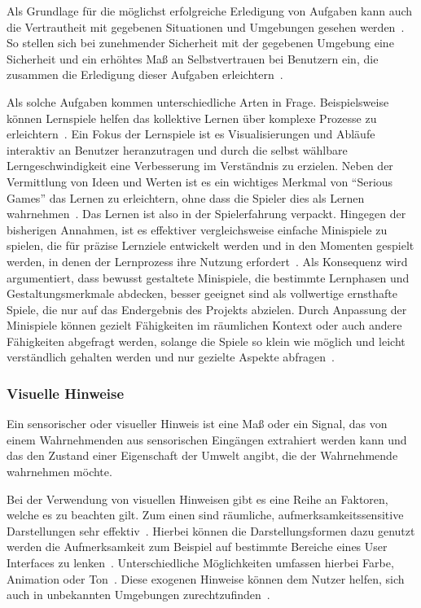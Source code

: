 Als Grundlage für die möglichst erfolgreiche Erledigung von Aufgaben kann auch die Vertrautheit mit gegebenen Situationen und Umgebungen gesehen werden~\cite{scott1966activation}. So stellen sich bei zunehmender Sicherheit mit der gegebenen Umgebung eine Sicherheit und ein erhöhtes Maß an Selbstvertrauen bei Benutzern ein, die zusammen die Erledigung dieser Aufgaben erleichtern~\cite{scott1966activation}. 

Als solche Aufgaben kommen unterschiedliche Arten in Frage. Beispielsweise können Lernspiele helfen das kollektive Lernen über komplexe Prozesse zu erleichtern~\cite{devisch2018mini, lampert2008gespielte, michael2005serious, ritterfeld2009serious}.
Ein Fokus der Lernspiele ist es Visualisierungen und Abläufe interaktiv an Benutzer heranzutragen und durch die selbst wählbare Lerngeschwindigkeit eine Verbesserung im Verständnis zu erzielen.
Neben der Vermittlung von Ideen und Werten ist es ein wichtiges Merkmal von "`Serious Games"' das Lernen zu erleichtern, ohne dass die Spieler dies als Lernen wahrnehmen~\cite{devisch2018mini, michael2005serious, ritterfeld2009serious}.
Das Lernen ist also in der Spielerfahrung verpackt.
Hingegen der bisherigen Annahmen, ist es effektiver vergleichsweise einfache Minispiele zu spielen, die für präzise Lernziele entwickelt werden und in den Momenten gespielt werden, in denen der Lernprozess ihre Nutzung erfordert~\cite{devisch2018mini}.
Als Konsequenz wird argumentiert, dass bewusst gestaltete Minispiele, die bestimmte Lernphasen und Gestaltungsmerkmale abdecken, besser geeignet sind als vollwertige ernsthafte Spiele, die nur auf das Endergebnis des Projekts abzielen. 
Durch Anpassung der Minispiele können gezielt Fähigkeiten im räumlichen Kontext oder auch andere Fähigkeiten abgefragt werden, solange die Spiele so klein wie möglich und leicht verständlich gehalten werden und nur gezielte Aspekte abfragen~\cite{devisch2018mini, michael2005serious, ritterfeld2009serious}.

\subsubsection{Visuelle Hinweise}

Ein sensorischer oder visueller Hinweis ist eine Maß oder ein Signal, das von einem Wahrnehmenden aus sensorischen Eingängen extrahiert werden kann und das den Zustand einer Eigenschaft der Umwelt angibt, die der Wahrnehmende wahrnehmen möchte.

Bei der Verwendung von visuellen Hinweisen gibt es eine Reihe an Faktoren, welche es zu beachten gilt. Zum einen sind räumliche, aufmerksamkeitssensitive Darstellungen sehr effektiv~\cite{bonanni2005attention}. Hierbei können die Darstellungsformen dazu genutzt werden die Aufmerksamkeit zum Beispiel auf bestimmte Bereiche eines User Interfaces zu lenken~\cite{keller1994visual}. Unterschiedliche Möglichkeiten umfassen hierbei Farbe, Animation oder Ton~\cite{keller1994visual}. Diese exogenen Hinweise können dem Nutzer helfen, sich auch in unbekannten Umgebungen zurechtzufinden~\cite{bonanni2005attention}.

